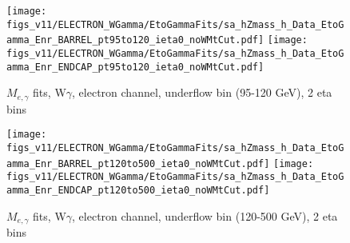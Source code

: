 \begin{figure}[htb]
  \begin{center}
   \texttt{[image: figs\_v11/ELECTRON\_WGamma/EtoGammaFits/sa\_hZmass\_h\_Data\_EtoGamma\_Enr\_BARREL\_pt95to120\_ieta0\_noWMtCut.pdf]}
   \texttt{[image: figs\_v11/ELECTRON\_WGamma/EtoGammaFits/sa\_hZmass\_h\_Data\_EtoGamma\_Enr\_ENDCAP\_pt95to120\_ieta0\_noWMtCut.pdf]}\\
  \label{fig:etogFits_95to120}
  \caption{$M_{e,\gamma}$ fits, W$\gamma$, electron channel, underflow bin (95-120 GeV), 2 eta bins}
  \end{center}
\end{figure}

\begin{figure}[htb]
  \begin{center}
   \texttt{[image: figs\_v11/ELECTRON\_WGamma/EtoGammaFits/sa\_hZmass\_h\_Data\_EtoGamma\_Enr\_BARREL\_pt120to500\_ieta0\_noWMtCut.pdf]}
   \texttt{[image: figs\_v11/ELECTRON\_WGamma/EtoGammaFits/sa\_hZmass\_h\_Data\_EtoGamma\_Enr\_ENDCAP\_pt120to500\_ieta0\_noWMtCut.pdf]}\\
  \label{fig:etogFits_120to500}
  \caption{$M_{e,\gamma}$ fits, W$\gamma$, electron channel, underflow bin (120-500 GeV), 2 eta bins}
  \end{center}
\end{figure}


